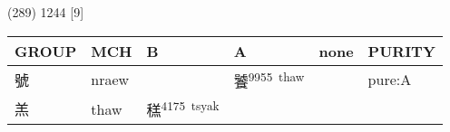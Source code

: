 \documentclass[14pt,a4paper]{scrartcl}
\begin{document}
(289) 1244 {[}9{]}

\begin{longtable}[c]{@{}llllll@{}}
\toprule
\begin{minipage}[b]{0.14\columnwidth}\raggedright\strut
GROUP
\strut\end{minipage} &
\begin{minipage}[b]{0.14\columnwidth}\raggedright\strut
MCH
\strut\end{minipage} &
\begin{minipage}[b]{0.14\columnwidth}\raggedright\strut
B
\strut\end{minipage} &
\begin{minipage}[b]{0.14\columnwidth}\raggedright\strut
A
\strut\end{minipage} &
\begin{minipage}[b]{0.14\columnwidth}\raggedright\strut
none
\strut\end{minipage} &
\begin{minipage}[b]{0.14\columnwidth}\raggedright\strut
PURITY
\strut\end{minipage}\tabularnewline
\midrule
\endhead
\begin{minipage}[t]{0.14\columnwidth}\raggedright\strut
號
\strut\end{minipage} &
\begin{minipage}[t]{0.14\columnwidth}\raggedright\strut
nraew
\strut\end{minipage} &
\begin{minipage}[t]{0.14\columnwidth}\raggedright\strut
\strut\end{minipage} &
\begin{minipage}[t]{0.14\columnwidth}\raggedright\strut
饕\textsuperscript{9955~thaw}
\strut\end{minipage} &
\begin{minipage}[t]{0.14\columnwidth}\raggedright\strut
\strut\end{minipage} &
\begin{minipage}[t]{0.14\columnwidth}\raggedright\strut
pure:A
\strut\end{minipage}\tabularnewline
\begin{minipage}[t]{0.14\columnwidth}\raggedright\strut
羔
\strut\end{minipage} &
\begin{minipage}[t]{0.14\columnwidth}\raggedright\strut
thaw
\strut\end{minipage} &
\begin{minipage}[t]{0.14\columnwidth}\raggedright\strut
䅵\textsuperscript{4175~tsyak}

\end{minipage}
\end{longtable}
\end{document}
